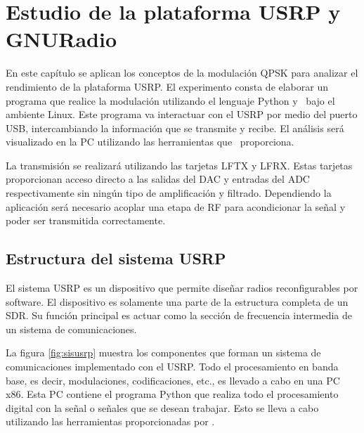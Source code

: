 \chapter{Estudio de la plataforma USRP y GNURadio}

En este cap\'itulo se aplican los conceptos de la modulaci\'on QPSK para
analizar el rendimiento de la plataforma USRP. El experimento consta de elaborar
un programa que realice la modulaci\'on utilizando el lenguaje Python y
\gnuradio\ bajo el ambiente Linux. Este programa va interactuar con el USRP
por medio del puerto USB, intercambiando la informaci\'on que se transmite y
recibe. El an\'alisis ser\'a visualizado en la PC utilizando las herramientas
que \gnuradio\ proporciona.

La transmisi\'on se realizar\'a utilizando las tarjetas LFTX y LFRX. Estas
tarjetas proporcionan acceso directo a las salidas del DAC y entradas del ADC
respectivamente sin ning\'un tipo de amplificaci\'on y filtrado. Dependiendo la
aplicaci\'on ser\'a necesario acoplar una etapa de RF para acondicionar la
se\~nal y poder ser transmitida correctamente.

\section{Estructura del sistema USRP}

El sistema USRP es un dispositivo que permite dise\~nar radios reconfigurables
por software. El dispositivo es solamente una parte de la estructura completa de
un SDR. Su funci\'on principal es actuar como la secci\'on de frecuencia intermedia de un sistema de
comunicaciones.

La figura \ref{fig:sisusrp} muestra los componentes que forman un sistema de
comunicaciones implementado con el USRP. Todo el procesamiento en banda base, es decir,
modulaciones, codificaciones, etc., es llevado a cabo en una PC x86. Esta PC
contiene el programa Python que realiza todo el procesamiento digital con la
se\~nal o se\~nales que se desean trabajar. Esto se lleva a cabo utilizando las
herramientas proporcionadas por \gnuradio.

